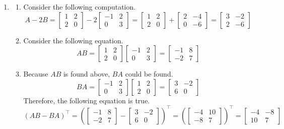 \documentclass[../main.tex]{subfiles}
\begin{document}
\begin{enumerate}
\item
\begin{enumerate}
\item
Consider the following computation.
\[
A - 2B =
\begin{bmatrix}
    1 & 2 \\
    2 & 0
\end{bmatrix}
-
2\begin{bmatrix}
    -1 & 2 \\
    0  & 3
\end{bmatrix}
=
\begin{bmatrix}
    1 & 2 \\
    2 & 0
\end{bmatrix}
+
\begin{bmatrix}
    2 & -4 \\
    0 & -6
\end{bmatrix}
=
\begin{bmatrix}
    3 & -2 \\
    2 & -6
\end{bmatrix}
\]
\item
Consider the following equation.
\[
AB =
\begin{bmatrix}
    1 & 2 \\
    2 & 0
\end{bmatrix}
\begin{bmatrix}
    -1 & 2 \\
    0  & 3
\end{bmatrix}
=
\begin{bmatrix}
    -1 & 8 \\
    -2 & 7
\end{bmatrix}
\]
\item
Because $AB$ is found above, $BA$ could be found.
\[
BA =
\begin{bmatrix}
    -1 & 2 \\
    0  & 3
\end{bmatrix}
\begin{bmatrix}
    1 & 2 \\
    2 & 0
\end{bmatrix}
=
\begin{bmatrix}
    3 & -2 \\
    6 & 0
\end{bmatrix}
\]
Therefore, the following equation is true.
\[
(AB - BA)^\intercal =
\left(
\begin{bmatrix}
    -1 & 8 \\
    -2 & 7
\end{bmatrix}
-
\begin{bmatrix}
    3 & -2 \\
    6 & 0
\end{bmatrix}
\right)^\intercal
=
\left(
\begin{bmatrix}
    -4 & 10 \\
    -8 & 7
\end{bmatrix}
\right)^\intercal
=
\begin{bmatrix}
    -4 & -8 \\
    10 & 7
\end{bmatrix}
\]
\end{enumerate}


\end{enumerate}
\end{document}
